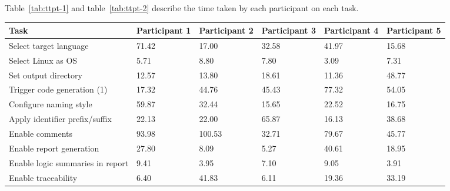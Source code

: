 Table~\ref{tab:ttpt-1} and table~\ref{tab:ttpt-2} describe the time taken by each participant on each task.

\begin{table}[htbp]
	\centering
	\caption{Usability Task Performance Summary (Tasks 1–10, Task Times in Seconds)}
	\label{tab:ttpt-1}
	\begin{xltabular}{\textwidth}{X X X X X X}
		\toprule
		\textbf{Task} & Participant 1 & Participant 2 & Participant 3 & Participant 4 & Participant 5 \\
		\midrule
		Select target language 				& 71.42 & 17.00 & 32.58 & 41.97 & 15.68 \\
		Select Linux as OS 					& 5.71 & 8.80 & 7.80 & 3.09 & 7.31 \\
		Set output directory 				& 12.57 & 13.80 & 18.61 & 11.36 & 48.77 \\
		Trigger code generation (1)			& 17.32 & 44.76 & 45.43 & 77.32 & 54.05 \\
		Configure naming style 				& 59.87 & 32.44 & 15.65 & 22.52 & 16.75 \\
		Apply identifier prefix/suffix 		& 22.13 & 22.00 & 65.87 & 16.13 & 38.68 \\
		Enable comments 					& 93.98 & 100.53 & 32.71 & 79.67 & 45.77 \\
		Enable report generation  			& 27.80 & 8.09 & 5.27 & 40.61 & 18.95 \\
		Enable logic summaries in report	& 9.41 & 3.95 & 7.10 & 9.05 & 3.91 \\
		Enable traceability 				& 6.40 & 41.83 & 6.11 & 19.36 & 33.19 \\
		\bottomrule
	\end{xltabular}
\end{table}


